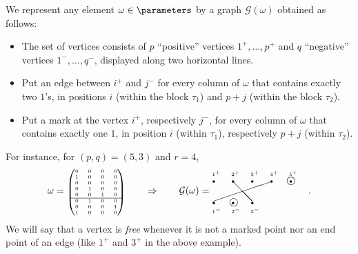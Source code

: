 We represent any element $\omega\in\parameters$ by a graph $\mathcal{G}(\omega)$ obtained as follows:
\begin{itemize}
\item
The set of vertices consists of $p$ ``positive'' vertices $1^+,\ldots,p^+$ and $q$ ``negative'' vertices $1^-,\ldots,q^-$, displayed along two horizontal lines.
\item Put an edge between $i^+$ and $j^-$ for every column of $\omega$ that contains exactly two $1$'s, in positions $i$ (within the block $\tau_1$) and $p+j$ (within the block $\tau_2$).
\item
Put a mark at the vertex $i^+$, respectively $j^-$, for every column of $\omega$ that contains exactly one $1$, in position $i$ (within $\tau_1$), respectively $p+j$ (within $\tau_2$).
\end{itemize}
For instance, for $(p,q)=(5,3)$ and $r=4$,
\begin{equation}
\label{2.1}
\omega=\mbox{\tiny $\begin{pmatrix} 0 & 0 & 0 & 0\\ 1 & 0 & 0 & 0\\ 0 & 0 & 0 & 0\\ 0 & 1 & 0 & 0\\ 0 & 0 & 1 & 0\\ \hline 0 & 1 & 0 & 0\\ 0 & 0 & 0 & 1\\ 1 & 0 & 0 & 0 \end{pmatrix}$}
\qquad
\Rightarrow
\qquad
\mathcal{G}(\omega)=
\mbox{\tiny
$\begin{picture}(100,20)(0,0)
\put(0,11){$\bullet$}\put(20,11){$\bullet$}\put(40,11){$\bullet$}\put(60,11){$\bullet$}\put(80,11){$\bullet$}
\put(0,18){$1^+$}\put(20,18){$2^+$}\put(40,18){$3^+$}\put(60,18){$4^+$}\put(80,18){$5^+$}
\put(0,-11){$\bullet$}\put(20,-11){$\bullet$}\put(40,-11){$\bullet$}
\put(0,-20){$1^-$}\put(20,-20){$2^-$}\put(40,-20){$3^-$}
\put(21,13){\line(1,-1){21}}
\put(61,12){\line(-3,-1){60}}
\put(82,13){\circle{8}}
\put(22.5,-9){\circle{8}}
\end{picture}$}.
\end{equation}
We will say that a vertex is {\em free} whenever it is not a marked
point nor an end point of an edge (like $1^+$ and $3^+$ in the above
example).

